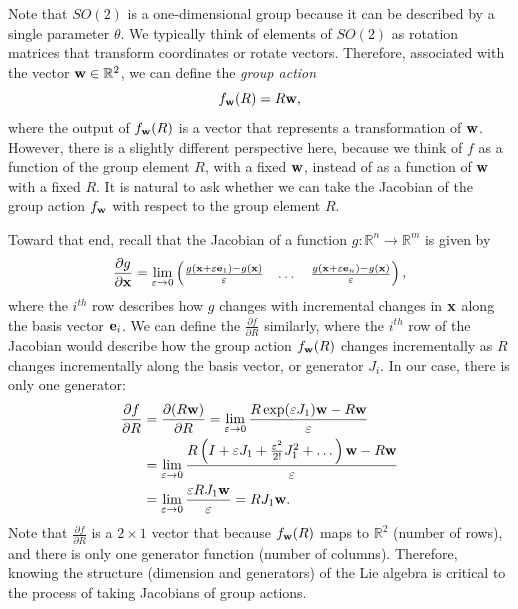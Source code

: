 Note that $SO(2)$ is a one-dimensional group because it can be described by a single parameter $\theta$.  We typically think of elements of $SO(2)$ as rotation matrices that transform coordinates or rotate vectors.  Therefore, associated with the vector $\mathbf{w}\in\mathbb{R}^2$, we can define the {\em group action}
\[
	f_{\mathbf{w}}(R) = R\mathbf{w},
\]
where the output of $f_{\mathbf{w}}(R)$ is a vector that represents a transformation of $\mathbf{w}$.  However, there is a slightly different perspective here, because we think of $f$ as a function of the group element $R$, with a fixed $\mathbf{w}$, instead of as a function of $\mathbf{w}$ with a fixed $R$.  It is natural to ask whether we can take the Jacobian of the group action $f_{\mathbf{w}}$ with respect to the group element $R$.  

Toward that end, recall that the Jacobian of a function $g: \mathbb{R}^n\to\mathbb{R}^m$ is given by
\[
\frac{\partial g}{\partial \mathbf{x}} = \lim_{\varepsilon\to 0} \begin{pmatrix} \frac{g(\mathbf{x}+\varepsilon\mathbf{e}_1)-g(\mathbf{x})}{\varepsilon} & \dots & \frac{g(\mathbf{x}+\varepsilon\mathbf{e}_n)-g(\mathbf{x})}{\varepsilon}\end{pmatrix},
\]
where the $i^{th}$ row describes how  $g$ changes with incremental changes in $\mathbf{x}$ along the basis vector $\mathbf{e}_i$.  
We can define the $\frac{\partial f}{\partial R}$ similarly, where the $i^{th}$ row of the Jacobian would describe how the group action $f_{\mathbf{w}}(R)$ changes incrementally as $R$ changes incrementally along the basis vector, or generator $J_i$.  In our case, there is only one generator: 
\begin{align*}
\frac{\partial f}{\partial R} &= \frac{\partial (R\mathbf{w})}{\partial R} 
  = \lim_{\varepsilon\to 0} \frac{R\exp(\varepsilon J_1)\mathbf{w} - R\mathbf{w}}{\varepsilon} \\
  &= \lim_{\varepsilon\to 0} \frac{R\left(I + \varepsilon J_1 + \frac{\varepsilon^2}{2!}J_1^2 + \dots \right)\mathbf{w} - R\mathbf{w}}{\varepsilon} \\
  &= \lim_{\varepsilon\to 0} \frac{\varepsilon RJ_1\mathbf{w}}{\varepsilon} 
  = R J_1 \mathbf{w}.
\end{align*}
Note that $\frac{\partial f}{\partial R}$ is a $2\times 1$ vector that because $f_{\mathbf{w}}(R)$ maps to $\mathbb{R}^2$ (number of rows), and there is only one generator function (number of columns).
Therefore, knowing the structure (dimension and generators) of the Lie algebra is critical to the process of taking Jacobians of group actions.

